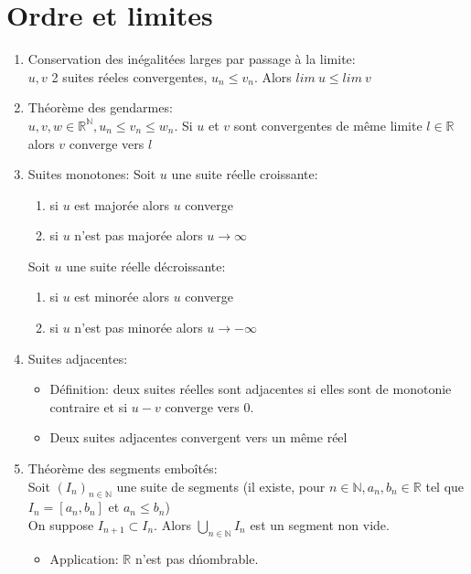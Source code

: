 \documentclass[fleqn]{article}
\begin{document}
\section{Ordre et limites}
\begin{enumerate}
	\item Conservation des in\'egalit\'ees larges par passage \`a la limite: \\
		$u, v$ 2 suites r\'eeles convergentes, $u_n \leq v_n$. Alors $lim\ u \leq lim\ v$
	\item Th\'eor\`eme des gendarmes: \\
		$u, v, w \in \mathbb{R}^\mathbb{N}, u_n \leq v_n \leq w_n$. Si $u$ et $v$ sont convergentes de m\^eme limite $l \in \mathbb{R}$
		alors $v$ converge vers $l$
	\item Suites monotones:
		Soit $u$ une suite r\'eelle croissante:
		\begin{enumerate}
			\item si $u$ est major\'ee alors $u$ converge
			\item si $u$ n'est pas major\'ee alors $u \rightarrow \infty$
		\end{enumerate}
		Soit $u$ une suite r\'eelle d\'ecroissante:
		\begin{enumerate}
			\item si $u$ est minor\'ee alors $u$ converge
			\item si $u$ n'est pas minor\'ee alors $u \rightarrow -\infty$
		\end{enumerate}
	\item Suites adjacentes:
		\begin{itemize}
			\item D\'efinition: deux suites r\'eelles sont adjacentes si elles sont de monotonie contraire et si $u-v$ converge vers 0.
			\item Deux suites adjacentes convergent vers un m\^eme r\'eel
		\end{itemize}
	\item Th\'eor\`eme des segments embo\^it\'es: \\
		Soit $(I_n)_{n \in \mathbb{N}}$ une suite de segments (il existe, pour $n \in \mathbb{N}, a_n, b_n \in \mathbb{R}$ tel que
		$I_n = [a_n, b_n]$ et $a_n \leq b_n$) \\
		On suppose $I_{n+1} \subset I_n$. Alors $\bigcup_{n \in \mathbb{N}} I_n$ est un segment non vide.
		\begin{itemize}
			\item Application: $\mathbb{R}$ n'est pas d\'nombrable.
		\end{itemize}
\end{enumerate}
\end{document}
